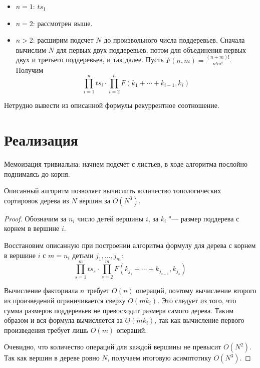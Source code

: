 \documentclass[a4paper,12pt]{article}
\begin{document}
\begin{itemize}
\item $n = 1$: $ts_1$
\item $n = 2$: рассмотрен выше.
\item $n > 2$: расширим подсчет $N$ до произвольного числа поддеревьев.
  Сначала вычислим $N$ для первых двух поддеревьев, потом для объединения первых двух и третьего поддеревьев, и так далее.
  Пусть $ F(n, m) = \frac{(n+m)!}{n!m!} $.
  Получим \[ \prod^n_{i=1} ts_i \cdot \prod^{n}_{i=2} F(k_1 + \cdots + k_{i-1}, k_i) \]
\end{itemize}

Нетрудно вывести из описанной формулы рекуррентное соотношение.

\section*{Реализация}

Мемоизация тривиальна: начнем подсчет с листьев, в ходе алгоритма послойно поднимаясь до корня.

\begin{theorem}
Описанный алгоритм позволяет вычислить количество топологических сортировок дерева из $N$ вершин за $O(N^3)$.
\end{theorem}
\begin{proof}
Обозначим за $n_i$ число детей вершины $i$, за $k_i$ "--- размер поддерева с корнем в вершине $i$.

Восстановим описанную при построении алгоритма формулу для дерева с корнем в вершине $i$ с $m = n_i$ детьми $j_1, \dots, j_m$:
\[ \prod^{m}_{s=1} ts_s \cdot \prod^{m}_{s=2} F(k_{j_1} + \cdots + k_{j_{s-1}}, k_{j_s}) \]

Вычисление факториала $n$ требует $O(n)$ операций, поэтому вычисление второго из произведений ограничивается сверху $O(m k_i)$. Это следует из того, что сумма размеров поддеревьев не превосходит размера самого дерева. Таким образом и вся формула вычисляется за $O(mk_i)$, так как вычисление первого произведения требует лишь $O(m)$ операций.

Очевидно, что количество операций для каждой вершины не превысит $O(N^2)$. Так как вершин в дереве ровно $N$, получаем итоговую асимптотику $O(N^3)$.
\end{proof}
\end{document}

